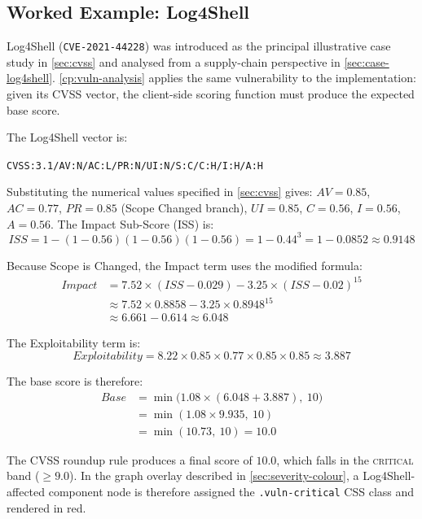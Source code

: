 \subsection{Worked Example: Log4Shell}
\label{sec:cvss-log4shell}

Log4Shell (\texttt{CVE-2021-44228}) was introduced as the principal illustrative case study in \autoref{sec:cvss} and analysed from a supply-chain perspective in \autoref{sec:case-log4shell}. \autoref{cp:vuln-analysis} applies the same vulnerability to the implementation: given its CVSS vector, the client-side scoring function must produce the expected base score.

The Log4Shell vector is:
\begin{center}
    \texttt{CVSS:3.1/AV:N/AC:L/PR:N/UI:N/S:C/C:H/I:H/A:H}
\end{center}

Substituting the numerical values specified in \autoref{sec:cvss} gives: \(AV = 0.85\), \(AC = 0.77\), \(PR = 0.85\) (Scope Changed branch), \(UI = 0.85\), \(C = 0.56\), \(I = 0.56\), \(A = 0.56\). The Impact Sub-Score (ISS) is:
\[
    \mathit{ISS} = 1 - (1 - 0.56)(1 - 0.56)(1 - 0.56) = 1 - 0.44^3 = 1 - 0.0852 \approx 0.9148
\]

Because Scope is Changed, the Impact term uses the modified formula:
\begin{align*}
    \mathit{Impact} &= 7.52 \times (\mathit{ISS} - 0.029) - 3.25 \times (\mathit{ISS} - 0.02)^{15} \\
    &\approx 7.52 \times 0.8858 - 3.25 \times 0.8948^{15} \\
    &\approx 6.661 - 0.614 \approx 6.048
\end{align*}

The Exploitability term is:
\[
    \mathit{Exploitability} = 8.22 \times 0.85 \times 0.77 \times 0.85 \times 0.85 \approx 3.887
\]

The base score is therefore:
\begin{align*}
    \mathit{Base} &= \min\bigl(1.08 \times (6.048 + 3.887),\ 10\bigr) \\
    &= \min(1.08 \times 9.935,\ 10) \\
    &= \min(10.73,\ 10) = 10.0
\end{align*}

The CVSS roundup rule produces a final score of \(10.0\), which falls in the \textsc{critical} band (\(\geq 9.0\)). In the graph overlay described in \autoref{sec:severity-colour}, a Log4Shell-affected component node is therefore assigned the \texttt{.vuln-critical} CSS class and rendered in red.


